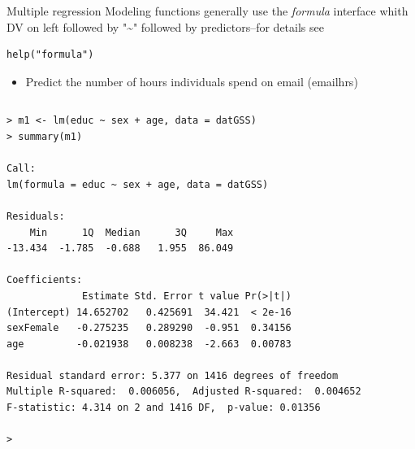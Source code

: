 \documentclass[table,smaller]{beamer}
\begin{document}
\begin{frame}[fragile,label=sec-7-5]{Multiple regression}
 Modeling functions generally use the \emph{formula} interface whith DV on left followed by "\textasciitilde{}" followed by predictors--for details see
\begin{verbatim}
help("formula")
\end{verbatim}

\begin{itemize}
\item Predict the number of hours individuals spend on email (emailhrs)
\end{itemize}
\vspace{-.5em}
\begin{columns}
\begin{block}{}
\begin{verbatim}
> m1 <- lm(educ ~ sex + age, data = datGSS)
> summary(m1)

Call:
lm(formula = educ ~ sex + age, data = datGSS)

Residuals:
    Min      1Q  Median      3Q     Max 
-13.434  -1.785  -0.688   1.955  86.049 

Coefficients:
             Estimate Std. Error t value Pr(>|t|)
(Intercept) 14.652702   0.425691  34.421  < 2e-16
sexFemale   -0.275235   0.289290  -0.951  0.34156
age         -0.021938   0.008238  -2.663  0.00783

Residual standard error: 5.377 on 1416 degrees of freedom
Multiple R-squared:  0.006056,	Adjusted R-squared:  0.004652 
F-statistic: 4.314 on 2 and 1416 DF,  p-value: 0.01356

>
\end{verbatim}
\end{block}
\end{columns}
\vspace{.5em}
\end{frame}
\end{document}
